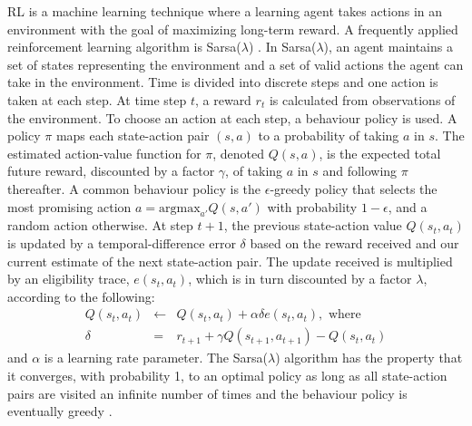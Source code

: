 \documentclass[letterpaper]{article}
\numberwithin{equation}{section}
\numberwithin{theorem}{section}
\numberwithin{lemma}{section}
\numberwithin{df}{section}
\begin{document}
RL is a machine learning technique where a learning agent takes actions in an environment with the goal of maximizing long-term reward.  A frequently applied reinforcement learning algorithm is Sarsa($\lambda$) \cite{SuttonBarto1998}.  In Sarsa($\lambda$), an agent maintains a set of states representing the environment and a set of valid actions the agent can take in the environment. Time is divided into discrete steps and one action is taken at each step.  At time step $t$, a reward $r_t$ is calculated from observations of the environment.   To choose an action at each step, a behaviour policy is used.  A policy $\pi$ maps each state-action pair $(s,a)$ to a probability of taking $a$ in $s$.  The estimated action-value function for $\pi$, denoted $Q(s,a)$, is the expected total future reward, discounted by a factor $\gamma$, of taking $a$ in $s$ and following $\pi$ thereafter.  A common behaviour policy is the $\epsilon$-greedy policy that selects the most promising action $a = \text{argmax}_{a'} Q(s,a')$ with probability $1-\epsilon$, and a random action otherwise.  At step $t+1$, the previous state-action value $Q(s_t,a_t)$ is updated by a temporal-difference error $\delta$ based on the reward received and our current estimate of the next state-action pair.
The update received is multiplied by an eligibility trace, $e(s_t,a_t)$, which is in turn discounted by a factor $\lambda$, according to the following:
\begin{eqnarray*}
	Q(s_t, a_t) &\leftarrow& Q(s_t, a_t) + {\alpha} {\delta} e(s_t, a_t), \text{ where} \\
	\delta &=& r_{t+1} + \gamma Q(s_{t+1}, a_{t+1}) - Q(s_t, a_t)
\end{eqnarray*}
and $\alpha$ is a learning rate parameter.  The Sarsa($\lambda$) algorithm has the property that it converges, with probability 1, to an optimal policy as long as all state-action pairs are visited an infinite number of times and the behaviour policy is eventually greedy \cite{SuttonBarto1998}. 
\end{document}
